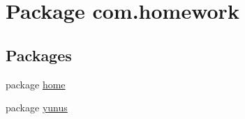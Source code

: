 \hypertarget{namespacecom_1_1homework}{}\section{Package com.\+homework}
\label{namespacecom_1_1homework}
\subsection*{Packages}
\begin{DoxyCompactItemize}
\item 
package \hyperlink{namespacecom_1_1homework_1_1home}{home}
\item 
package \hyperlink{namespacecom_1_1homework_1_1yunus}{yunus}
\end{DoxyCompactItemize}
